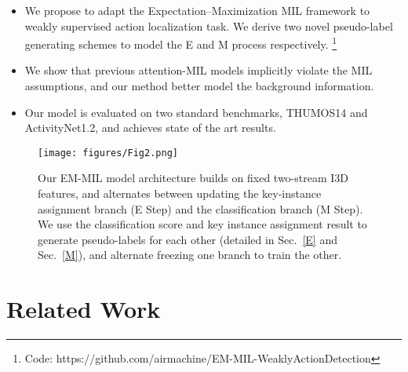 \documentclass[runningheads]{llncs}
\begin{document}
\begin{itemize}
    \item We propose to adapt the Expectation–Maximization MIL framework to weakly supervised action localization task. We derive two novel pseudo-label generating schemes to model the E and M process respectively. \footnote{Code:
    https://github.com/airmachine/EM-MIL-WeaklyActionDetection}

     \item We show that previous attention-MIL models implicitly violate the MIL assumptions, and our method better model the background information. 
    \item Our model is evaluated on two standard benchmarks, THUMOS14 and ActivityNet1.2, and achieves state of the art results. 
    
\end{itemize}











 
\begin{figure*} [t]
    \centering
    \texttt{[image: figures/Fig2.png]}
    \caption{Our EM-MIL model architecture builds on fixed two-stream I3D features, and alternates between updating the key-instance assignment branch \bm{} (E Step) and the classification branch \bm{} (M Step). We use the classification score and key instance assignment result to generate pseudo-labels for each other (detailed in Sec.~\ref{E} and Sec.~\ref{M}), and alternate freezing one branch to train the other. 
}
    \label{fig:architecture}
\end{figure*}


\section{Related Work}
\label{sec:related}
\end{document}

